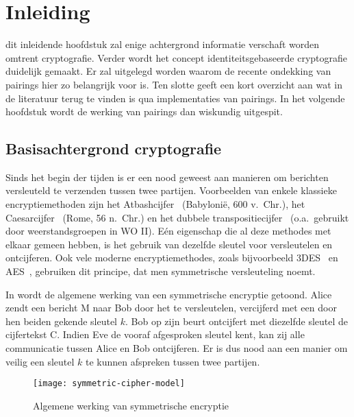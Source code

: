 \section{Inleiding}

 dit inleidende hoofdstuk zal enige achtergrond informatie verschaft worden omtrent cryptografie. Verder wordt het concept identiteitsgebaseerde cryptografie duidelijk gemaakt. Er zal uitgelegd worden waarom de recente ondekking van pairings hier zo belangrijk voor is. Ten slotte geeft een kort overzicht aan wat in de literatuur terug te vinden is qua implementaties van pairings. In het volgende hoofdstuk wordt de werking van pairings dan wiskundig uitgespit.

\subsection{Basisachtergrond cryptografie}

Sinds het begin der tijden is er een nood geweest aan manieren om berichten versleuteld te verzenden tussen twee partijen. Voorbeelden van enkele klassieke encryptiemethoden zijn het Atbashcijfer~\cite{athbash} (Babyloni\"e, 600 v.\ Chr.), het Caesarcijfer~\cite{caesar} (Rome, 56 n.\ Chr.) en het dubbele transpositiecijfer~\cite{kahn} (o.a.\ gebruikt door weerstandsgroepen in WO II). E\'en eigenschap die al deze methodes met elkaar gemeen hebben, is het gebruik van dezelfde sleutel voor versleutelen en ontcijferen. Ook vele moderne encryptiemethodes, zoals bijvoorbeeld 3DES~\cite{3des} en AES~\cite{aes}, gebruiken dit principe, dat men symmetrische versleuteling noemt.

In  wordt de algemene werking van een symmetrische encryptie getoond. Alice zendt een bericht M naar Bob door het te versleutelen, vercijferd met een door hen beiden gekende sleutel $k$. Bob op zijn beurt ontcijfert met diezelfde sleutel de cijfertekst C. Indien Eve de vooraf afgesproken sleutel kent, kan zij alle communicatie tussen Alice en Bob ontcijferen. Er is dus nood aan een manier om veilig een sleutel $k$ te kunnen afspreken tussen twee partijen.

\begin{figure}[h]
	\centering
		\texttt{[image: symmetric-cipher-model]}
		\caption{Algemene werking van symmetrische encryptie\label{fig-encryptie-applicaties-sym-cipher}}
\end{figure}

